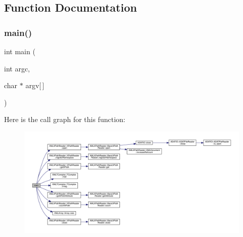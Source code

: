 \subsection{Function Documentation}
\mbox{\label{adat-devel_2other__libs_2xpath__reader_2examples_2xpath__reader__test_8cc_a0ddf1224851353fc92bfbff6f499fa97}} 
\subsubsection{\texorpdfstring{main()}{main()}}
{\footnotesize\ttfamily int main (\begin{DoxyParamCaption}\item[{int}]{argc,  }\item[{char $\ast$}]{argv\mbox{[}$\,$\mbox{]} }\end{DoxyParamCaption})}

Here is the call graph for this function\+:
\nopagebreak
\begin{figure}[H]
\begin{center}
\leavevmode
\includegraphics[width=350pt]{d8/d72/adat-devel_2other__libs_2xpath__reader_2examples_2xpath__reader__test_8cc_a0ddf1224851353fc92bfbff6f499fa97_cgraph}
\end{center}
\end{figure}
